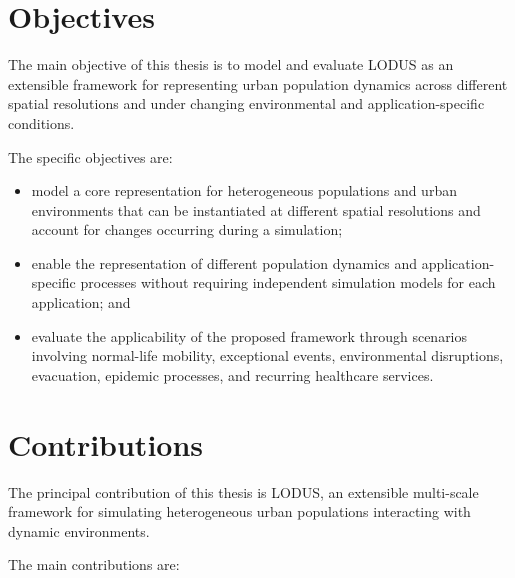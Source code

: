 \section{Objectives}
\label{sec:introduction_objectives}

The main objective of this thesis is to model and evaluate LODUS as an extensible framework for representing urban population dynamics across different spatial resolutions and under changing environmental and application-specific conditions.

The specific objectives are:

\begin{itemize}
    \item model a core representation for heterogeneous populations and urban environments that can be instantiated at different spatial resolutions and account for changes occurring during a simulation;

    \item enable the representation of different population dynamics and application-specific processes without requiring independent simulation models for each application; and

    \item evaluate the applicability of the proposed framework through scenarios involving normal-life mobility, exceptional events, environmental disruptions, evacuation, epidemic processes, and recurring healthcare services.
\end{itemize}


\section{Contributions}
\label{sec:introduction_contributions}

The principal contribution of this thesis is LODUS, an extensible multi-scale framework for simulating heterogeneous urban populations interacting with dynamic environments. 

The main contributions are:

